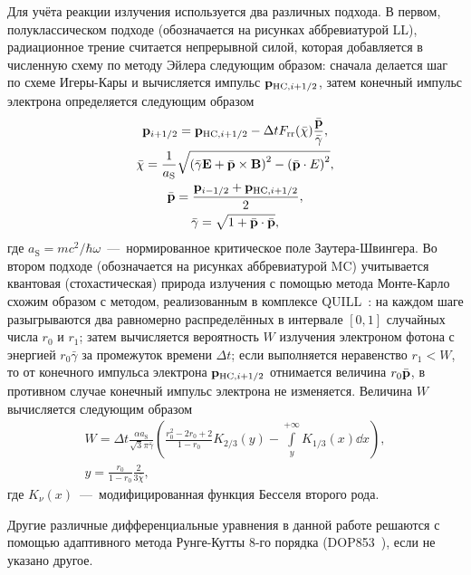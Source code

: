Для учёта реакции излучения используется два различных подхода.
В первом, полуклассическом подходе (обозначается на рисунках аббревиатурой LL), радиационное трение считается непрерывной силой, которая добавляется в численную схему по методу Эйлера следующим образом: сначала делается шаг по схеме Игеры-Кары и вычисляется импульс $\vb{p}_{\mathrm{HC}, i+1/2}$, затем конечный импульс электрона определяется следующим образом
\begin{gather}
    \vb{p}_{i+1/2} = \vb{p}_{\mathrm{HC}, i+1/2} - \Delta t F_\mathrm{rr} (\bar{\chi}) \frac{\bar{\vb{p}}}{\bar{\gamma}} , \\
    \bar{\chi} = \frac{1}{a_\mathrm{S}}\sqrt{\left( \bar{\gamma} \vb{E} + \bar{\vb{p}}\times\vb{B} \right)^2 - \left( \bar{\vb{p}} \cdot E \right)^2}, \\
    \bar{\vb{p}} = \frac{\vb{p}_{i-1/2} + \vb{p}_{\mathrm{HC}, i+1/2}}{2}, \\
    \bar{\gamma} = \sqrt{1 + \bar{\vb{p}}\cdot\bar{\vb{p}}},
\end{gather} 
где $a_\mathrm{S} = mc^2 / \hbar\omega$~---~нормированное критическое поле Заутера-Швингера.
Во втором подходе (обозначается на рисунках аббревиатурой MC) учитывается квантовая (стохастическая) природа излучения с помощью метода Монте-Карло схожим образом с методом, реализованным в комплексе QUILL~\cite{QUILL, elkina2011qed}: на каждом шаге разыгрываются два равномерно распределённых в интервале $[0, 1]$ случайных числа $r_0$ и $r_1$; затем вычисляется вероятность $W$ излучения электроном фотона с энергией $r_0 \bar{\gamma}$ за промежуток времени $\Delta t$; если выполняется неравенство $r_1 < W$, то от конечного импульса электрона $\vb{p}_{\mathrm{HC}, i+1/2}$ отнимается величина $r_0 \bar{\vb{p}}$, в противном случае конечный импульс электрона не изменяется.
Величина $W$ вычисляется следующим образом~\cite{Baier98}
\begin{gather}
    W = \Delta t \frac{ \alpha a_\mathrm{S}}{\sqrt{3}\pi\bar{\gamma}} \left( \frac{r_0^2 - 2 r_0 + 2}{1 - r_0}K_{2/3}( y ) - \int\limits_y^{+\infty} K_{1/3}(x)\dd x \right), \\
    y = \frac{r_0}{1 - r_0}\frac{2}{3 \bar{\chi}},
\end{gather}
где $K_\nu(x)$~---~модифицированная функция Бесселя второго рода.

Другие различные дифференциальные уравнения в данной работе решаются с помощью адаптивного метода Рунге-Кутты 8-го порядка (DOP853~\cite{hairer1993solving}), если не указано другое.